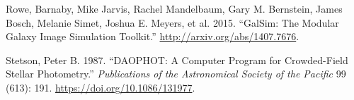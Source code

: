 \documentclass[10pt,a4paper,onecolumn]{article}
\begin{document}
\begin{cslreferences}
\leavevmode\hypertarget{ref-rowe2015galsim}{}%
Rowe, Barnaby, Mike Jarvis, Rachel Mandelbaum, Gary M. Bernstein, James
Bosch, Melanie Simet, Joshua E. Meyers, et al. 2015. ``GalSim: The
Modular Galaxy Image Simulation Toolkit.''
\url{http://arxiv.org/abs/1407.7676}.

\leavevmode\hypertarget{ref-Stetson_1987}{}%
Stetson, Peter B. 1987. ``DAOPHOT: A Computer Program for Crowded-Field
Stellar Photometry.'' \emph{Publications of the Astronomical Society of
the Pacific} 99 (613): 191. \url{https://doi.org/10.1086/131977}.
\end{cslreferences}
\end{document}
